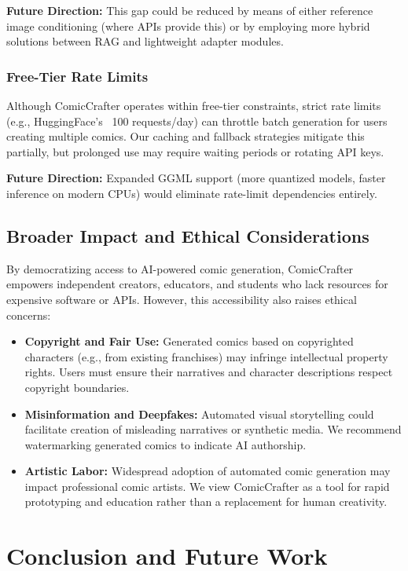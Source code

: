 \documentclass[runningheads]{llncs}
\begin{document}
\textbf{Future Direction:} This gap could be reduced by means of either reference image conditioning (where APIs provide this) or by employing more hybrid solutions between RAG and lightweight adapter modules.

\subsubsection{Free-Tier Rate Limits}

Although ComicCrafter operates within free-tier constraints, strict rate limits (e.g., HuggingFace's ~100 requests/day) can throttle batch generation for users creating multiple comics. Our caching and fallback strategies mitigate this partially, but prolonged use may require waiting periods or rotating API keys.

\textbf{Future Direction:} Expanded GGML support (more quantized models, faster inference on modern CPUs) would eliminate rate-limit dependencies entirely.

\subsection{Broader Impact and Ethical Considerations}

By democratizing access to AI-powered comic generation, ComicCrafter empowers independent creators, educators, and students who lack resources for expensive software or APIs. However, this accessibility also raises ethical concerns:
\begin{itemize}
\item \textbf{Copyright and Fair Use:} Generated comics based on copyrighted characters (e.g., from existing franchises) may infringe intellectual property rights. Users must ensure their narratives and character descriptions respect copyright boundaries.
\item \textbf{Misinformation and Deepfakes:} Automated visual storytelling could facilitate creation of misleading narratives or synthetic media. We recommend watermarking generated comics to indicate AI authorship.
\item \textbf{Artistic Labor:} Widespread adoption of automated comic generation may impact professional comic artists. We view ComicCrafter as a tool for rapid prototyping and education rather than a replacement for human creativity.
\end{itemize}

\section{Conclusion and Future Work}
\label{sec:conclusion}
\end{document}
